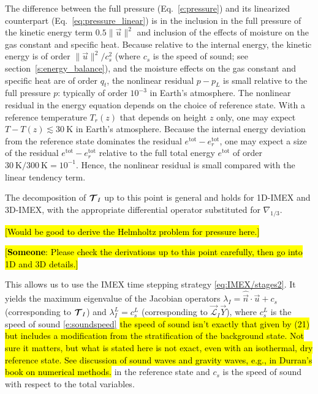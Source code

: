 \documentclass{report}
\begin{document}
The difference between the full pressure (Eq.~\ref{e:pressure}) and its linearized counterpart (Eq.~\ref{eq:pressure_linear}) is in the inclusion in the full pressure of the kinetic energy term $0.5 \|\vec{u} \|^2$ and inclusion of the effects of moisture on the gas constant and specific heat. Because relative to the internal energy, the kinetic energy is of order $\|\vec{u}\|^2/c_s^2$ (where $c_s$ is the speed of sound; see section~\ref{s:energy_balance}), and the moisture effects on the gas constant and specific heat are of order $q_t$, the nonlinear residual $p-p_L$ is small relative to the full pressure $p$: typically of order $10^{-3}$ in Earth's atmosphere. The nonlinear residual in the energy equation depends on the choice of reference state. With a reference temperature $T_r(z)$ that depends on height $z$ only, one may expect $T - T(z) \lesssim 30~\mathrm{K}$ in Earth's atmosphere. Because the internal energy deviation from the reference state dominates the residual $e^{\mathrm{tot}} - e^{\mathrm{tot}}_r$, one may expect a size of the residual $e^{\mathrm{tot}} - e^{\mathrm{tot}}_r$ relative to the full total energy $e^{\mathrm{tot}}$ of order $30~\mathrm{K}/300~\mathrm{K} = 10^{-1}$. Hence, the nonlinear residual is small compared with the linear tendency term.
 
The decomposition of $\boldsymbol{{\mathcal{T}}}_I$ up to this point is general and holds for 1D-IMEX and 3D-IMEX, with the appropriate differential operator substituted for $\nabla_{1/3}$.

\hl{[Would be good to derive the Helmholtz problem for pressure here.]}

\hl{[\textbf{Someone}: Please check the derivations up to this point carefully, then go into 1D and 3D details.]}

This allows us to use the IMEX time stepping strategy \eqref{eq:IMEX/stages2}. It yields the maximum eigenvalue of the Jacobian operators  $\lambda_{I}=\widehat{\vec{n}} \cdot \vec{u} + c_{s}$ (corresponding to $\boldsymbol{{\mathcal{T}}}_{I}$) and  $\lambda^L_{I} = c^L_s$ (corresponding to $\vec{\mathcal{L}}_{I}\vec{Y}$), where $c^L_s$ is the speed of sound \eqref{e:soundspeed} \hl{the speed of sound isn't exactly that given by (21) but includes a modification from the stratification of the background state. Not sure it matters, but what is stated here is not exact, even with an isothermal, dry reference state. See discussion of sound waves and gravity waves, e.g., in Durran's book on numerical methods.} in the reference state and $c_s$ is the speed of sound with respect to the total variables. 
 
\end{document}
